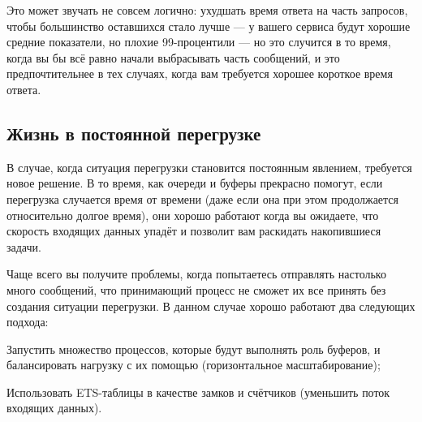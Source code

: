 Это может звучать не совсем логично: ухудшать время ответа на часть запросов, чтобы большинство оставшихся стало лучше --- у вашего сервиса будут хорошие средние показатели, но плохие 99-процентили --- но это случится в то время, когда вы бы всё равно начали выбрасывать часть сообщений, и это предпочтительнее в тех случаях, когда вам требуется хорошее короткое время ответа.


\subsection{Жизнь в постоянной перегрузке}

В случае, когда ситуация перегрузки становится постоянным явлением, требуется новое решение. В то время, как очереди и буферы прекрасно помогут, если перегрузка случается время от времени (даже если она при этом продолжается относительно долгое время), они хорошо работают когда вы ожидаете, что скорость входящих данных упадёт и позволит вам раскидать накопившиеся задачи.

Чаще всего вы получите проблемы, когда попытаетесь отправлять настолько много сообщений, что принимающий процесс не сможет их все принять без создания ситуации перегрузки. В данном случае хорошо работают два следующих подхода:

\begin{itemize*}
	\item Запустить множество процессов, которые будут выполнять роль буферов, и балансировать нагрузку с их помощью (горизонтальное масштабирование);
	\item Использовать ETS-таблицы в качестве замков и счётчиков (уменьшить поток входящих данных).
\end{itemize*}

